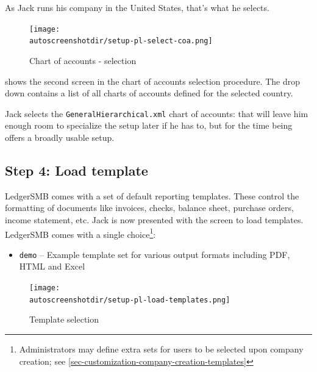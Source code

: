 As Jack runs his company in the United States, that's what he selects.

\begin{figure}[H]
\centering
\texttt{[image: \\autoscreenshotdir/setup-pl-select-coa.png]}
\caption{Chart of accounts - selection}
\label{fig:setup-step3}
\end{figure}

 shows the second screen in the chart of accounts selection procedure.
The drop down contains a list of all charts of accounts defined for the selected country.

Jack selects the \texttt{GeneralHierarchical.xml} chart of accounts: that will
leave him enough room to specialize the setup later if he has to, but for the time
being offers a broadly usable setup.

\subsection{Step 4: Load template}
\label{subsec-create-setup-load-template}

LedgerSMB comes with a set of default reporting templates. 
These control the formatting of documents like invoices, checks, balance sheet, purchase orders, income statement, etc. 
Jack is now presented with the screen to load templates. LedgerSMB \ledgerSMBversion comes with a single choice\footnote{Administrators may define extra sets for users to be selected upon company creation; see \ref{sec-customization-company-creation-templates}}:
\begin{itemize}
        \item  \texttt{demo} -- Example template set for various output formats including PDF, HTML and Excel
\end{itemize}

\begin{figure}[H]
    \centering
    \texttt{[image: \\autoscreenshotdir/setup-pl-load-templates.png]}
    \caption{Template selection}
    \label{fig:setup-step4}
\end{figure}

